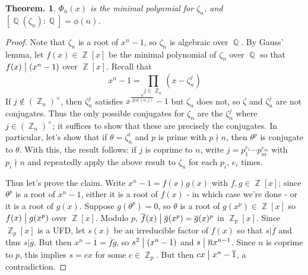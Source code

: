 \documentclass[11pt, a4paper]{memoir}
\DeclareMathOperator{\Q}{{\mathbb{Q}}}
\DeclareMathOperator{\Z}{{\mathbb{Z}}}
\renewcommand{\div}{\bigm|}
\newcommand{\ol}[1]{\ensuremath{\overline{#1}}}
\theoremstyle{change}
\newtheorem{theorem}{Theorem.}[section]
\theoremstyle{plain}
\theoremstyle{nonumberplain}
\newtheorem{proof}{Proof}
\numberwithin{equation}{section}
\begin{document}
\begin{theorem}
    $\Phi_n(x)$ is the minimal polynmial for $\zeta_n$, and $[\Q(\zeta_n):\Q]=\phi(n)$.
\end{theorem}
\begin{proof}
    Note that $\zeta_n$ is a root of $x^n-1$, so $\zeta_n$ is algebraic over $\Q$.
    By Gauss' lemma, let $f(x)\in\Z[x]$ be the minimal polynomial of $\zeta_n$ over $\Q$ so that $f(x)\div(x^n-1)$ over $\Z[x]$.
    Recall that
    \begin{equation*}
        x^n-1=\prod\limits_{j\in\Z_n}(x-\zeta_n^j)
    \end{equation*}
    If $j\notin(\Z_n)^\times$, then $\zeta_n^j$ satisfies $x^{\frac{n}{\gcd(n,j)}}-1$ but $\zeta_n$ does not, so $\zeta$ and $\zeta_n^j$ are not conjugates.
    Thus the only possible conjugates for $\zeta_n$ are the $\zeta_n^j$ where $j\in(\Z_n)^\times$; it suffices to show that these are precisely the conjugates.
    In particular, let's show that if $\theta=\zeta_n^t$ and $p$ is prime with $p\nmid n$, then $\theta^p$ is conjugate to $\theta$.
    With this, the result follows: if $j$ is coprime to $n$, write $j=p_1^{e_1}\cdots p_m^{e_m}$ with $p_i\nmid n$ and repeatedly apply the above result to $\zeta_n$ for each $p_i$, $e_i$ times.

    Thus let's prove the claim.
    Write $x^n-1=f(x)g(x)$ with $f,g\in\Z[x]$; since $\theta^p$ is a root of $x^n-1$, either it is a root of $f(x)$ - in which case we're done - or it is a root of $g(x)$.
    Suppose $g(\theta^p)=0$, so $\theta$ is a root of $g(x^p)\in\Z[x]$ so $f(x)\div g(x^p)$ over $\Z[x]$.
    Modulo $p$, $\ol{f}(x)\div\ol{g}(x^p)=\ol{g}(x)^p$ in $\Z_p[x]$.
    Since $\Z_p[x]$ is a UFD, let $s(x)$ be an irreducible factor of $f(x)$ so that $s|\ol{f}$ and thus $s|\ol{g}$.
    But then $x^{n}-\ol{1}=\ol{f}\ol{g}$, so $s^2\div(x^n-1)$ and $s\div\ol{n}x^{n-1}$.
    Since $n$ is coprime to $p$, this implies $s=cx$ for some $c\in\Z_p$.
    But then $cx\div x^n-\ol{1}$, a contradiction.
\end{proof}
\end{document}
